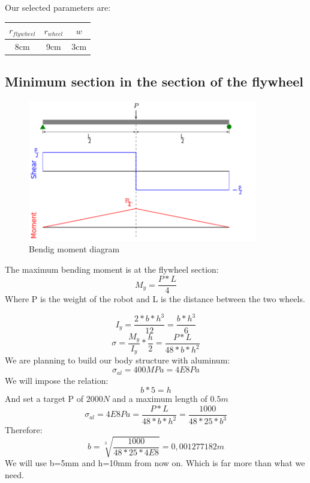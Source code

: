 Our selected parameters are:
\begin{center}
	\begin{tabular}{ |c|c|c| } 
	 \hline
	 $r_{flywheel}$ & $r_{wheel}$ & $w$ \\
	 \hline 
	 8cm & 9cm & 3cm \\ 
	 \hline
	\end{tabular}
	\end{center}

\subsection{Minimum section in the section of the flywheel}
\begin{figure}[ht]
	\centering
	\includegraphics[width=10cm]{img/Shear_Moment_Diagram.png}
	\caption{Bendig moment diagram}
	\label{fig:Bendig moment diagram}
\end{figure}
The maximum bending moment is at the flywheel section:
\[M_y = \frac{P * L}{4}\]
Where P is the weight of the robot and L is the distance between the two wheels.



\[I_y = \frac{2*b*h^3}{12}=\frac{b*h^3}{6}\]
\[\sigma=\frac{M_y}{I_y}*\frac{h}{2} = \frac{P*L}{48*b*h^2}\]
We are planning to build our body structure with aluminum:
\[\sigma_{al} = 400MPa = 4E8Pa\]
We will impose the relation:
\[b * 5 = h\]
And set a target P of $2000N$ and a maximum length of $0.5m$
\[\sigma_{al} = 4E8Pa = \frac{P*L}{48*b*h^2} = \frac{1000}{48*25*b^3} \]
Therefore:
\[b = \sqrt[3]{\frac{1000}{48*25*4E8}} = 0,001277182 m\]
We will use b=5mm and h=10mm from now on. Which is far more than what we need.

